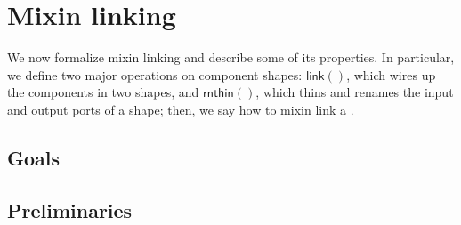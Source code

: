 \chapter{Mixin linking} %
\label{sec:mix-in}

We now formalize mixin linking and describe some of its properties.
In particular, we define two major operations
on component shapes: $\textsf{link}()$, which wires up the components in
two shapes, and $\textsf{rnthin}()$, which thins and renames the input
and output ports of a shape; then, we say how to mixin link a
\ccomp{}.

\section{Goals}


\section{Preliminaries}

